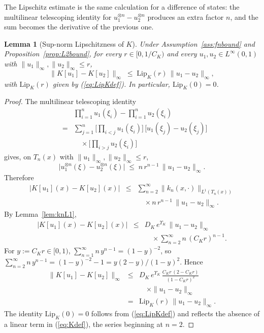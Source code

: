 \documentclass[amsthm]{autart}
\theoremstyle{plain}
\newtheorem{lemma}{Lemma}
\theoremstyle{definition}
\newcommand{\Linf}{L^\infty}
\newcommand{\Lipk}{\mathrm{Lip}_K}
\begin{document}
The Lipschitz estimate is the same calculation for a difference of states: the multilinear telescoping identity for $u_1^{\otimes n} - u_2^{\otimes n}$ produces an extra factor $n$, and the sum becomes the derivative of the previous one.

\begin{lemma}[Sup-norm Lipschitzness of $K$]\label{lem:KLip}
Under Assumption~\ref{ass:fnbound} and Proposition~\ref{prop:L2bound}, for every $r \in [0, 1/C_K)$ and every $u_1, u_2 \in \Linf(0,1)$ with $\|u_1\|_\infty, \|u_2\|_\infty \le r$,
\begin{equation}
\|K[u_1] - K[u_2]\|_\infty \;\le\; \Lipk(r)\,\|u_1 - u_2\|_\infty,
\label{eq:KLip}
\end{equation}
with $\Lipk(r)$ given by (\ref{eq:LipKdef}). In particular, $\Lipk(0) = 0$.
\end{lemma}

\begin{proof}
The multilinear telescoping identity
\begin{eqnarray}
&& \prod_{i=1}^n u_1(\xi_i) - \prod_{i=1}^n u_2(\xi_i) \nonumber \\
&=& \sum_{j=1}^n \biggl[\prod_{i<j} u_1(\xi_i)\biggr]\,\bigl[u_1(\xi_j) - u_2(\xi_j)\bigr] \nonumber \\
&& \quad \times \biggl[\prod_{i>j} u_2(\xi_i)\biggr]
\label{eq:telescope}
\end{eqnarray}
gives, on $T_n(x)$ with $\|u_1\|_\infty, \|u_2\|_\infty \le r$,
\begin{equation}
\bigl|u_1^{\otimes n}(\xi) - u_2^{\otimes n}(\xi)\bigr| \;\le\; n\, r^{n-1}\, \|u_1 - u_2\|_\infty.
\label{eq:telescope_bound}
\end{equation}
Therefore
\begin{eqnarray}
|K[u_1](x) - K[u_2](x)| &\le& \sum_{n=2}^\infty \|k_n(x,\cdot)\|_{L^1(T_n(x))} \nonumber \\
&& \quad \times n\, r^{n-1}\, \|u_1 - u_2\|_\infty.
\label{eq:K1K2_sum}
\end{eqnarray}
By Lemma~\ref{lem:knL1},
\begin{eqnarray}
|K[u_1](x) - K[u_2](x)| &\le& D_K\, e^{\Upsilon_K}\, \|u_1 - u_2\|_\infty \nonumber \\
&& \quad \times \sum_{n=2}^\infty n\, (C_K r)^{n-1}.
\label{eq:K1K2_applied}
\end{eqnarray}
For $y := C_K r \in [0,1)$, $\sum_{n=1}^\infty n\, y^{n-1} = (1-y)^{-2}$, so $\sum_{n=2}^\infty n\, y^{n-1} = (1-y)^{-2} - 1 = y(2-y)/(1-y)^2$. Hence
\begin{eqnarray}
\|K[u_1] - K[u_2]\|_\infty &\le& D_K\, e^{\Upsilon_K}\, \frac{C_K r\,(2 - C_K r)}{(1 - C_K r)^2} \nonumber \\
&& \quad \times \|u_1 - u_2\|_\infty \nonumber \\
&=& \Lipk(r)\,\|u_1 - u_2\|_\infty.
\label{eq:K1K2_final}
\end{eqnarray}
The identity $\Lipk(0) = 0$ follows from (\ref{eq:LipKdef}) and reflects the absence of a linear term in (\ref{eq:Kdef}), the series beginning at $n=2$.
\end{proof}
\end{document}
